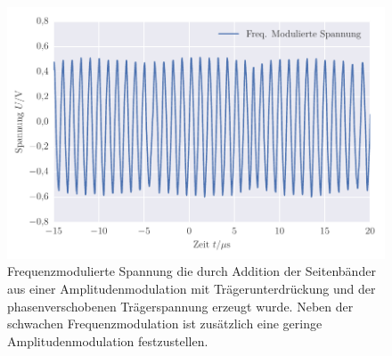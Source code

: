 
\FloatBarrier\begin{figure}[!h]
\centering
\includegraphics[scale=1]{../Grafiken/Frequenz_Modulierte_Spannung.pdf}
\caption{Frequenzmodulierte Spannung die durch Addition der Seitenbänder aus einer Amplitudenmodulation
	mit Trägerunterdrückung und der phasenverschobenen Trägerspannung erzeugt wurde. Neben der schwachen 
	Frequenzmodulation ist zusätzlich eine geringe Amplitudenmodulation festzustellen.  \label{fig:frequenz_modulierte_spannung}}
\end{figure}
\FloatBarrier